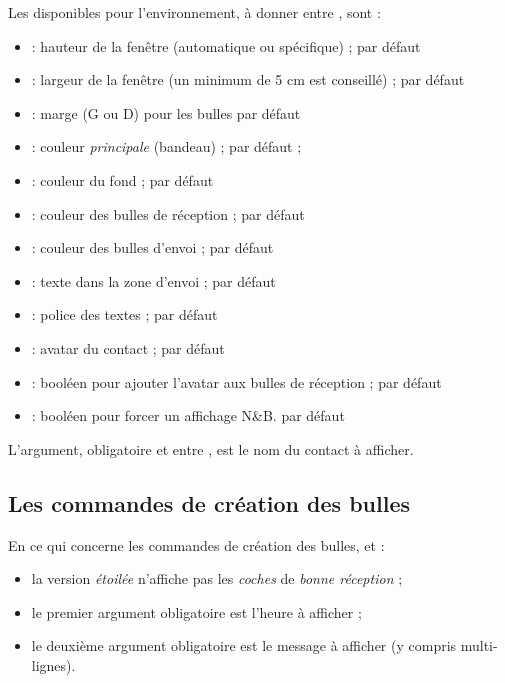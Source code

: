\documentclass[french,11pt,a4paper]{article}
\begin{document}
Les  disponibles pour l'environnement, à donner entre \MontreCode{[...]}, sont :

\begin{itemize}
	\item {} : hauteur de la fenêtre (automatique ou spécifique) ;  par défaut
	\item {} : largeur de la fenêtre (un minimum de 5 cm est conseillé) ; \MontreCode{7cm} par défaut
	\item {} : marge (G ou D) pour les bulles \MontreCode{1.5cm} par défaut
	\item {} : couleur \textit{principale} (bandeau) ;  par défaut ;
	\item {} : couleur du fond ;  par défaut
	\item {} : couleur des bulles de réception ;  par défaut
	\item {} : couleur des bulles d'envoi ;  par défaut
	\item {} : texte dans la zone d'envoi ;  par défaut
	\item {} : police des textes ;  par défaut
	\item {} : avatar du contact ;  par défaut
	\item {} : booléen pour ajouter l'avatar aux bulles de réception ;  par défaut
	\item {} : booléen pour forcer un affichage N\&B.  par défaut
\end{itemize}

L'argument, obligatoire et entre , est le nom du contact à afficher.

\subsection{Les commandes de création des bulles}

En ce qui concerne les commandes de création des bulles,  et  :

\begin{itemize}
	\item la version \textit{étoilée} n'affiche pas les \textit{coches} de \textit{bonne réception} ;
	\item le premier argument obligatoire est l'heure à afficher ;
	\item le deuxième argument obligatoire est le message à afficher (y compris multi-lignes).
\end{itemize}
\end{document}

